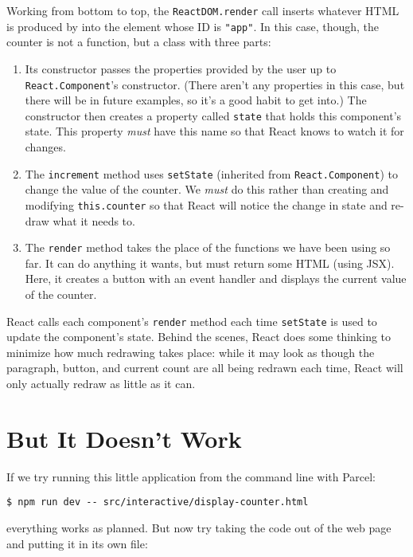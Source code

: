 Working from bottom to top,
the \texttt{ReactDOM.render} call inserts whatever HTML is produced by \texttt{}
into the element whose ID is \texttt{"app"}.
In this case,
though,
the counter is not a function,
but a class with three parts:

\begin{enumerate}
\item
  Its constructor passes the properties provided by the user up to \texttt{React.Component}'s constructor.
  (There aren't any properties in this case,
  but there will be in future examples,
  so it's a good habit to get into.)
  The constructor then creates a property called \texttt{state}
  that holds this component's state.
  This property \emph{must} have this name so that React knows to watch it for changes.
\item
  The \texttt{increment} method uses \texttt{setState} (inherited from \texttt{React.Component})
  to change the value of the counter.
  We \emph{must} do this rather than creating and modifying \texttt{this.counter}
  so that React will notice the change in state
  and re-draw what it needs to.
\item
  The \texttt{render} method takes the place of the functions we have been using so far.
  It can do anything it wants, but must return some HTML (using JSX).
  Here, it creates a button with an event handler and displays the current value of the counter.
\end{enumerate}

React calls each component's \texttt{render} method each time \texttt{setState} is used to update the component's state.
Behind the scenes,
React does some thinking to minimize how much redrawing takes place:
while it may look as though the paragraph, button, and current count are all being redrawn each time,
React will only actually redraw as little as it can.

\section{But It Doesn't Work}\label{s:interactive-babel}

If we try running this little application from the command line with Parcel:

\begin{verbatim}
$ npm run dev -- src/interactive/display-counter.html
\end{verbatim}

\noindent
everything works as planned.
But now try taking the code out of the web page and putting it in its own file:

